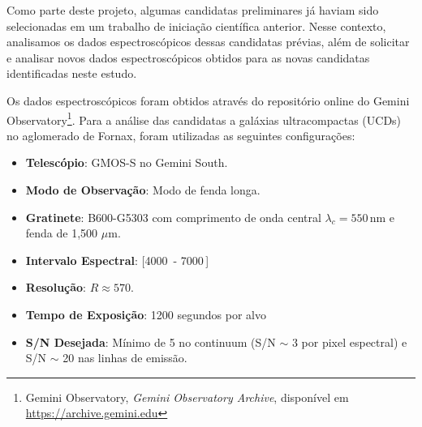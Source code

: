 \vspace{\baselineskip}

Como parte deste projeto, algumas candidatas preliminares já haviam sido selecionadas em um trabalho de iniciação científica anterior. Nesse contexto, analisamos os dados espectroscópicos dessas candidatas prévias, além de solicitar e analisar novos dados espectroscópicos obtidos para as novas candidatas identificadas neste estudo.

\vspace{\baselineskip}

Os dados espectroscópicos foram obtidos através do repositório online do Gemini Observatory\footnote{Gemini Observatory, \textit{Gemini Observatory Archive}, disponível em \url{https://archive.gemini.edu}}. Para a análise das candidatas a galáxias ultracompactas (UCDs) no aglomerado de Fornax, foram utilizadas as seguintes configurações:

\begin{itemize}
    \item \textbf{Telescópio}: GMOS-S no Gemini South.
    \item \textbf{Modo de Observação}: Modo de fenda longa.
    \item \textbf{Gratinete}: B600-G5303 com comprimento de onda central $\lambda_c = 550 \, \text{nm}$ e fenda de 1,500 $\mu\text{m}$.
    \item \textbf{Intervalo Espectral}: [4000\, - 7000\,]
    \item \textbf{Resolução}: $R \approx 570$.
    \item \textbf{Tempo de Exposição}: 1200 segundos por alvo
    \item \textbf{S/N Desejada}: Mínimo de 5 no continuum (S/N $\sim$ 3 por pixel espectral) e S/N $\sim$ 20 nas linhas de emissão.
\end{itemize}
